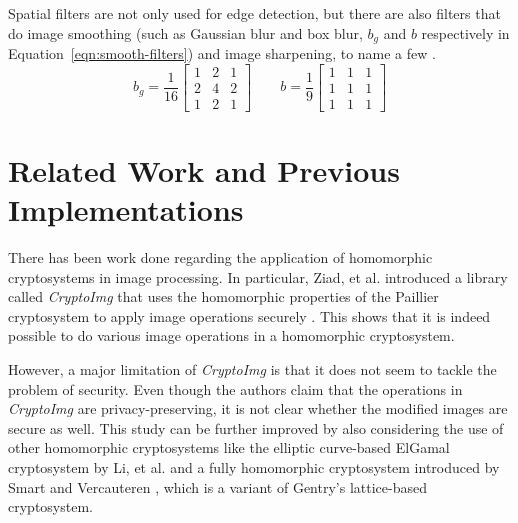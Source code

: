 Spatial filters are not only used for edge detection, but there are also filters that do image smoothing (such as Gaussian blur and box blur, $b_g$ and $b$ respectively in Equation~\ref{eqn:smooth-filters}) and image sharpening, to name a few \cite{gonzalez_digital_2008}.
\begin{equation}
    \label{eqn:smooth-filters}
    b_g = \frac{1}{16}
    \begin{bmatrix}
        1 & 2 & 1 \\
        2 & 4 & 2 \\
        1 & 2 & 1
    \end{bmatrix}
    \qquad
    b = \frac{1}{9}
    \begin{bmatrix}
        1 & 1 & 1 \\
        1 & 1 & 1 \\
        1 & 1 & 1
    \end{bmatrix}
\end{equation}


\section{Related Work and Previous Implementations}




There has been work done regarding the application of homomorphic cryptosystems in image processing. In particular, Ziad, et al. introduced a library called \textit{CryptoImg} that uses the homomorphic properties of the Paillier cryptosystem to apply image operations securely \cite{ziad_cryptoimg:_2016}. This shows that it is indeed possible to do various image operations in a homomorphic cryptosystem.

However, a major limitation of \textit{CryptoImg} is that it does not seem to tackle the problem of security. Even though the authors claim that the operations in \textit{CryptoImg} are privacy-preserving, it is not clear whether the modified images are secure as well.
This study can be further improved by also considering the use of other homomorphic cryptosystems like the elliptic curve-based ElGamal cryptosystem by Li, et al. \cite{li_elliptic_2012} and a fully homomorphic cryptosystem introduced by Smart and Vercauteren \cite{hutchison_fully_2010}, which is a variant of Gentry's lattice-based cryptosystem.

